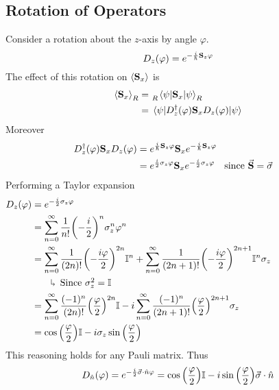 \documentclass[12pt,a4paper,titlepage]{article}
\newcommand{\explain}[1]{%
	\quad\rotatebox[origin=c]{180}{\enskip$\Lsh$}\hfill
	\begin{minipage}[t]{\dimexpr\linewidth-8em\relax}
	#1
	\end{minipage}\hspace{4em}\bigskip
}
\begin{document}
\subsection{Rotation of Operators}
Consider a rotation about the $z$-axis by angle $\varphi$.
\begin{equation}
D_{z}(\varphi)=e^{-\frac{i}{\hbar}\vb{S}_{z}\varphi}
\end{equation}
The effect of this rotation on $\expval{\vb{S}_{x}}$ is
\begin{equation}
\begin{aligned}
\expval{\vb{S}_{x}}_{R}&=\tensor*[_{R}]{\mel{\psi}{\vb{S}_{x}}{\psi}}{_{R}}\\
&=\mel{\psi}{D_{z}^{\dagger}(\varphi)\vb{S}_{x}D_{z}(\varphi)}{\psi}
\end{aligned}
\end{equation}
Moreover
\begin{equation}
\begin{aligned}
D_{z}^{\dagger}(\varphi)\vb{S}_{x}D_{z}(\varphi)&=e^{\frac{i}{\hbar}\vb{S}_{z}\varphi}\vb{S}_{x}e^{-\frac{i}{\hbar}\vb{S}_{z}\varphi}\\
&=e^{\frac{i}{2}\sigma_{z}\varphi}\vb{S}_{x}e^{-\frac{i}{2}\sigma_{z}\varphi}\qq{since $\vec{\vb{S}}=\vec{\sigma}$}
\end{aligned}
\end{equation}
Performing a Taylor expansion
\begin{equation}
\begin{aligned}
D_{z}(\varphi)&=e^{-\frac{i}{2}\sigma_{z}\varphi}\\
&=\sum_{n=0}^{\infty}\frac{1}{n!}\qty(-\frac{i}{2})^{n}\sigma_{z}^{n}\varphi^{n}\\
&=\sum_{n=0}^{\infty}\frac{1}{(2n)!}\qty(-\frac{i\varphi}{2})^{2n}\mathbb{I}^{n}+\sum_{n=0}^{\infty}\frac{1}{(2n+1)!}\qty(-\frac{i\varphi}{2})^{2n+1}\mathbb{I}^{n}\sigma_{z}\\
&\quad\explain{Since $\sigma_{z}^{2}=\mathbb{I}$}\\
&=\sum_{n=0}^{\infty}\frac{(-1)^{n}}{(2n)!}\qty(\frac{\varphi}{2})^{2n}\mathbb{I}-i\sum_{n=0}^{\infty}\frac{(-1)^{n}}{(2n+1)!}\qty(\frac{\varphi}{2})^{2n+1}\sigma_{z}\\
&=\cos\qty(\frac{\varphi}{2})\mathbb{I}-i\sigma_{z}\sin\qty(\frac{\varphi}{2})
\end{aligned}
\end{equation}
This reasoning holds for any Pauli matrix. Thus
\begin{equation}
\begin{aligned}
D_{\hat{n}}(\varphi)=e^{-\frac{i}{2}\vec{\sigma}\cdot\hat{n}\varphi}=\cos\qty(\frac{\varphi}{2})\mathbb{I}-i\sin\qty(\frac{\varphi}{2})\vec{\sigma}\cdot\hat{n}
\end{aligned}
\end{equation}
\end{document}
